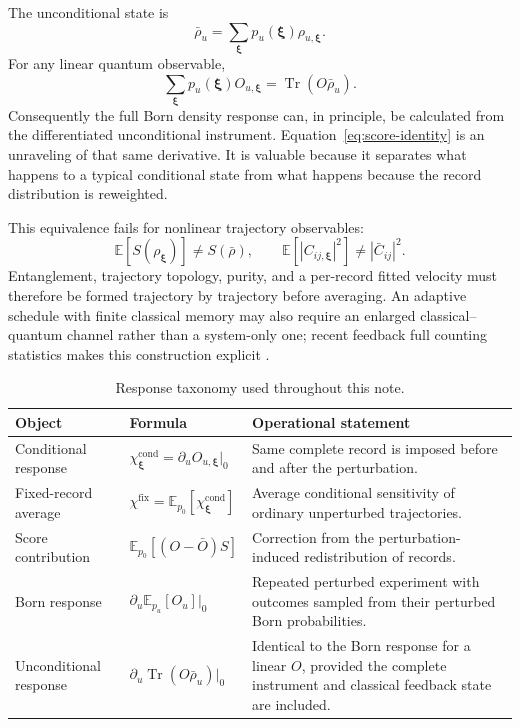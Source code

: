 \documentclass[aps,prb,onecolumn,nofootinbib,superscriptaddress]{revtex4-2}
\newcommand{\Tr}{\operatorname{Tr}}
\newcommand{\E}{\mathbb{E}}
\newcommand{\bxi}{\bm{\xi}}
\newcommand{\cond}{\mathrm{cond}}
\newcommand{\fixed}{\mathrm{fix}}
\begin{document}
The unconditional state is
\begin{equation}
  \bar\rho_u=\sum_{\bxi}p_u(\bxi)\rho_{u,\bxi}.
  \label{eq:unconditional-state}
\end{equation}
For any linear quantum observable,
\begin{equation}
  \sum_{\bxi}p_u(\bxi)O_{u,\bxi}
  =\Tr(O\bar\rho_u).
  \label{eq:linear-equivalence}
\end{equation}
Consequently the full Born density response can, in principle, be calculated
from the differentiated unconditional instrument.  Equation~\eqref{eq:score-identity}
is an unraveling of that same derivative.  It is valuable because it separates
what happens to a typical conditional state from what happens because the
record distribution is reweighted.

This equivalence fails for nonlinear trajectory observables:
\begin{equation}
  \E[S(\rho_{\bxi})]\ne S(\bar\rho),\qquad
  \E[|C_{ij,\bxi}|^2]\ne|\bar C_{ij}|^2.
\end{equation}
Entanglement, trajectory topology, purity, and a per-record fitted velocity must
therefore be formed trajectory by trajectory before averaging.  An adaptive
schedule with finite classical memory may also require an enlarged
classical--quantum channel rather than a system-only one; recent feedback full
counting statistics makes this construction explicit
\cite{RosalFiusaPottsLandi2026}.

\begin{table}[t]
\caption{Response taxonomy used throughout this note.}
\label{tab:response-taxonomy}
\small
\begin{tabularx}{\textwidth}{@{}L{0.20\textwidth}L{0.28\textwidth}Y@{}}
\toprule
Object & Formula & Operational statement \\
\midrule
Conditional response & $\chi_{\bxi}^{\cond}=\partial_uO_{u,\bxi}|_0$ &
Same complete record is imposed before and after the perturbation. \\
Fixed-record average & $\chi^{\fixed}=\E_{p_0}[\chi_{\bxi}^{\cond}]$ &
Average conditional sensitivity of ordinary unperturbed trajectories. \\
Score contribution & $\E_{p_0}[(O-\bar O)S]$ &
Correction from the perturbation-induced redistribution of records. \\
Born response & $\partial_u\E_{p_u}[O_u]|_0$ &
Repeated perturbed experiment with outcomes sampled from their perturbed Born
probabilities. \\
Unconditional response & $\partial_u\Tr(O\bar\rho_u)|_0$ &
Identical to the Born response for a linear $O$, provided the complete
instrument and classical feedback state are included. \\
\bottomrule
\end{tabularx}
\end{table}
\end{document}
